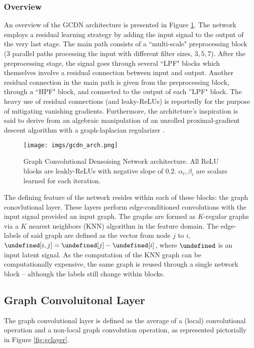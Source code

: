 \documentclass[12pt,a4paper,reqno]{amsart}
\let\bm\undefined
\newcommand{\bm}[1]{\mathbf{#1}}
\let\z\undefined
\newcommand{\z}{\bm{z}}
\let\L\undefined
\newcommand{\L}{\mathcal{L}}
\begin{document}
\subsubsection{Overview}
An overview of the GCDN architecture is presented in Figure \ref{fig:arch}.
The network employs a residual learning strategy by adding the input signal to
the output of the very last stage. The main path consists of a ``multi-scale"
preprocessing block (3 parallel paths processing the input with different filter
sizes, $3,5,7$). After the preprocessing stage, the signal goes through several
``LPF" blocks which themselves involve a residual connection between input and
output. Another residual connection in the main path is given from the
preprocessing block, through a ``HPF" block, and connected to the output of each
''LPF" block. The heavy use of residual connections (and leaky-ReLUs) is
reportedly for the purpose of mitigating vanishing gradients. Furthermore, the
architcture's inspiration is said to derive from an algebraic manipulation of an
unrolled proximal-gradient descent algorithm with a graph-laplacian regularizer
\cite{ValsesiaICIP19}.  

\begin{figure}[t]
\centering
\texttt{[image: imgs/gcdn\_arch.png]}
\caption{Graph Convolutional Densoising Network \cite{ValsesiaICIP19}
architecture. All ReLU blocks are leakly-ReLUs with negative slope of $0.2$.
$\alpha_i,\beta_i$ are scalars learned for each iteration.}
\label{fig:arch}
\end{figure}

The defining feature of the network resides within each of these blocks:
the graph conovlutional layer. These layers perform edge-conditioned
convolutions with the input signal provided an input graph. The graphs are
formed as $K$-regular graphs via a $K$ nearest neighbors (KNN) algorithm in the
feature domain. The edge-labels of said graph are defined as the vector from
node $j$ to $i$, $\L[i,j] = \z[j] - \z[i]$, where $\z$ is an input latent signal.
As the computation of the KNN graph can be computationally expensive, the same
graph is reused through a single network block -- although the labels still
change within blocks.

\subsection{Graph Convoluitonal Layer}
The graph convolutional layer is defined as the average of a (local)
convolutional operation and a non-local graph convolution operation, as
represented pictorially in Figure \ref{fig:gclayer}.
\end{document}
